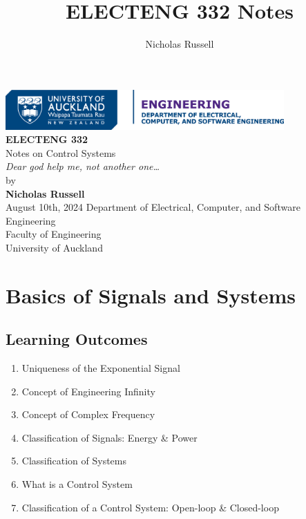 \documentclass[
  12pt,
  a4paper,
]{report}
\title{ELECTENG 332 Notes}
\author{Nicholas Russell}
\author{}
\date{}
\renewcommand*\contentsname{Table of contents}
\newcommand\contentsname{Table of contents}
\begin{document}
\begin{titlepage}
    \centering
    \includegraphics[width=0.8\textwidth]{images/DECSE-HC-4C-01.png}\\[1cm]
    {\LARGE \textbf{ELECTENG 332}}\\[0.5cm]
    {\Large Notes on Control Systems}\\[0.5cm]
    {\textit{Dear god help me, not another one\dots\ }}\\[2cm]
    {\large by}\\[0.3cm]
    {\large \textbf{Nicholas Russell}}\\[1.4cm]
    {\large August 10th, 2024}
    \vfill
    {\large Department of Electrical, Computer, and Software Engineering}\\[0.3cm]
    {\large Faculty of Engineering}\\[0.3cm]
    {\large University of Auckland}
\end{titlepage}

\renewcommand*\contentsname{Table of contents}
{
\hypersetup{linkcolor=}
\setcounter{tocdepth}{2}
\tableofcontents
}

\label{module1}
\chapter{Basics of Signals and
Systems}\label{basics-of-signals-and-systems}

\label{learningoutcomesmodule1}
\section*{Learning Outcomes}\label{learning-outcomes}

\begin{enumerate}[label=\(\blacktriangleright\), leftmargin=*, itemsep=0.5em]
    \item Uniqueness of the Exponential Signal
    \item Concept of Engineering Infinity
    \item Concept of Complex Frequency
    \item Classification of Signals: Energy \& Power
    \item Classification of Systems
    \item What is a Control System
    \item Classification of a Control System: Open-loop \& Closed-loop
\end{enumerate}
\end{document}
